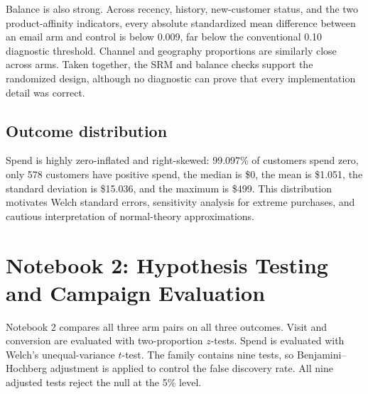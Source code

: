 \documentclass[11pt]{article}
\begin{document}
Balance is also strong. Across recency, history, new-customer status, and the two product-affinity indicators, every absolute standardized mean difference between an email arm and control is below 0.009, far below the conventional 0.10 diagnostic threshold. Channel and geography proportions are similarly close across arms. Taken together, the SRM and balance checks support the randomized design, although no diagnostic can prove that every implementation detail was correct.

\subsection{Outcome distribution}

Spend is highly zero-inflated and right-skewed: 99.097\% of customers spend zero, only 578 customers have positive spend, the median is \$0, the mean is \$1.051, the standard deviation is \$15.036, and the maximum is \$499. This distribution motivates Welch standard errors, sensitivity analysis for extreme purchases, and cautious interpretation of normal-theory approximations.

\section{Notebook 2: Hypothesis Testing and Campaign Evaluation}

Notebook 2 compares all three arm pairs on all three outcomes. Visit and conversion are evaluated with two-proportion $z$-tests. Spend is evaluated with Welch's unequal-variance $t$-test. The family contains nine tests, so Benjamini--Hochberg adjustment is applied to control the false discovery rate. All nine adjusted tests reject the null at the 5\% level.
\end{document}
